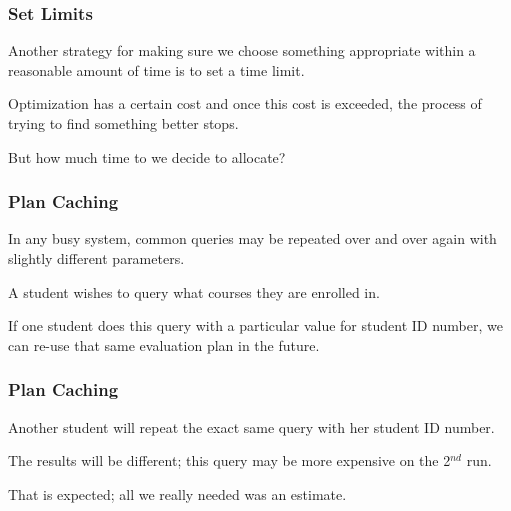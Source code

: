 \begin{frame}
\frametitle{Set Limits}

Another strategy for making sure we choose something appropriate within a reasonable amount of time is to set a time limit. 

Optimization has a certain cost and once this cost is exceeded, the process of trying to find something better stops. 

But how much time to we decide to allocate? 


\end{frame}

\begin{frame}
\frametitle{Plan Caching}

In any busy system, common queries may be repeated over and over again with slightly different parameters. 

A student wishes to query what courses they are enrolled in. 

If one student does this query with a particular value for student ID number, we can re-use that same evaluation plan in the future.

\end{frame}

\begin{frame}
\frametitle{Plan Caching}


Another student will repeat the exact same query with her student ID number.

The results will be different; this query may be more expensive on the 2$^{nd}$ run.

That is expected; all we really needed was an estimate.

\end{frame}







